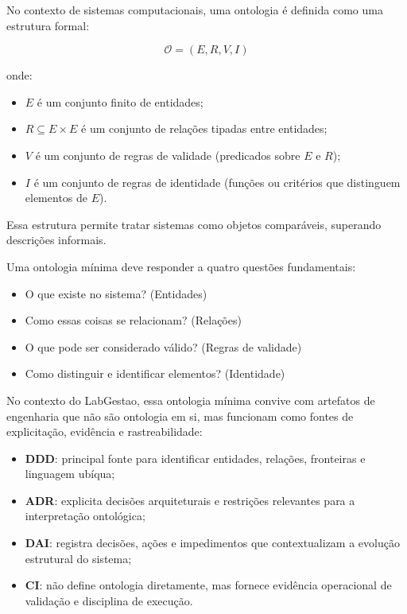 \documentclass[12pt,a4paper]{article}
\begin{document}
No contexto de sistemas computacionais, uma ontologia é definida como uma estrutura formal:

\[
\mathcal{O} = (E, R, V, I)
\]

onde:

\begin{itemize}
	\item \(E\) é um conjunto finito de entidades;
	\item \(R \subseteq E \times E\) é um conjunto de relações tipadas entre entidades;
	\item \(V\) é um conjunto de regras de validade (predicados sobre \(E\) e \(R\));
	\item \(I\) é um conjunto de regras de identidade (funções ou critérios que distinguem elementos de \(E\)).
\end{itemize}

Essa estrutura permite tratar sistemas como objetos comparáveis, superando descrições informais.

Uma ontologia mínima deve responder a quatro questões fundamentais:

\begin{itemize}
	\item O que existe no sistema? (Entidades)
	\item Como essas coisas se relacionam? (Relações)
	\item O que pode ser considerado válido? (Regras de validade)
	\item Como distinguir e identificar elementos? (Identidade)
\end{itemize}

No contexto do LabGestao, essa ontologia mínima convive com artefatos de engenharia que não são ontologia em si, mas funcionam como fontes de explicitação, evidência e rastreabilidade:

\begin{itemize}
	\item \textbf{DDD}: principal fonte para identificar entidades, relações, fronteiras e linguagem ubíqua;
	\item \textbf{ADR}: explicita decisões arquiteturais e restrições relevantes para a interpretação ontológica;
	\item \textbf{DAI}: registra decisões, ações e impedimentos que contextualizam a evolução estrutural do sistema;
	\item \textbf{CI}: não define ontologia diretamente, mas fornece evidência operacional de validação e disciplina de execução.
\end{itemize}
\end{document}
